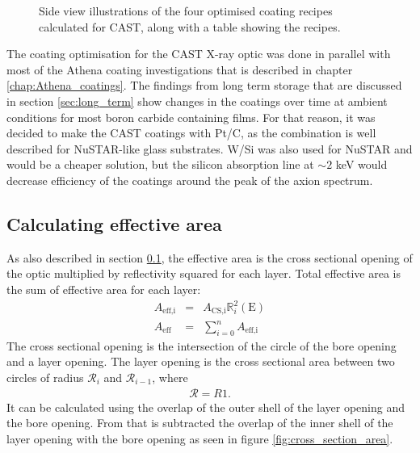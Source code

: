 \begin{figure}[htbp!]
  \caption{\footnotesize Side view illustrations of the four optimised coating recipes calculated for CAST, along with a table showing the recipes.}
  \label{fig:cast_recipes_sideview}
\end{figure}

The coating optimisation for the CAST X-ray optic was done in parallel with most of the Athena coating investigations that is described in chapter \ref{chap:Athena_coatings}. The findings from long term storage that are discussed in section \ref{sec:long_term} show changes in the coatings over time at ambient conditions for most boron carbide containing films. For that reason, it was decided to make the CAST coatings with Pt/C, as the combination is well described for NuSTAR-like glass substrates. W/Si was also used for NuSTAR and would be a cheaper solution, but the silicon absorption line at $\sim2$ keV would decrease efficiency of the coatings around the peak of the axion spectrum.

\subsection{Calculating effective area}\label{sec:eff_area}
As also described in section \ref{sec:eff_area}, the effective area is the cross sectional opening of the optic multiplied by reflectivity squared for each layer. Total effective area is the sum of effective area for each layer:
\begin{eqnarray}
  A_{\text{eff,i}} &=& A_{\text{CS,i}}\mathbb{R}_i^2(\text{E})\\
  A_{\text{eff}} &=& \sum_{i=0}^n A_{\text{eff,i}}
\end{eqnarray}
The cross sectional opening is the intersection of the circle of the bore opening and a layer opening. The layer opening is the cross sectional area between two circles of radius $\mathcal{R}_{i}$ and $\mathcal{R}_{i-1}$, where
\begin{eqnarray}
  \mathcal{R} = \mathit{R1}.
\end{eqnarray}
It can be calculated using the overlap of the outer shell of the layer opening and the bore opening. From that is subtracted the overlap of the inner shell of the layer opening with the bore opening as seen in figure \ref{fig:cross_section_area}.

